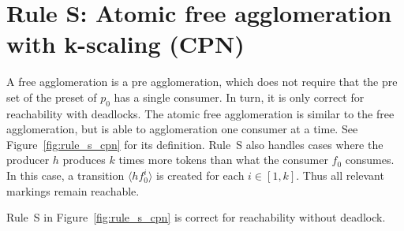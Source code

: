 \section*{Rule S: Atomic free agglomeration with k-scaling (CPN)}\label{sec:rule_s_cpn}
A free agglomeration is a pre agglomeration, which does not require that the pre set of the preset of $p_0$ has a single consumer.
In turn, it is only correct for reachability with deadlocks.
The atomic free agglomeration is similar to the free agglomeration, but is able to agglomeration one consumer at a time.
See Figure~\ref{fig:rule_s_cpn} for its definition.
Rule~S also handles cases where the producer $h$ produces $k$ times more tokens than what the consumer $f_0$ consumes.
In this case, a transition $\langle h f_0^i\rangle$ is created for each $i\in [1, k]$.
Thus all relevant markings remain reachable.

\begin{theorem}
    Rule~S in Figure~\ref{fig:rule_s_cpn} is correct for reachability without deadlock.
\end{theorem}

